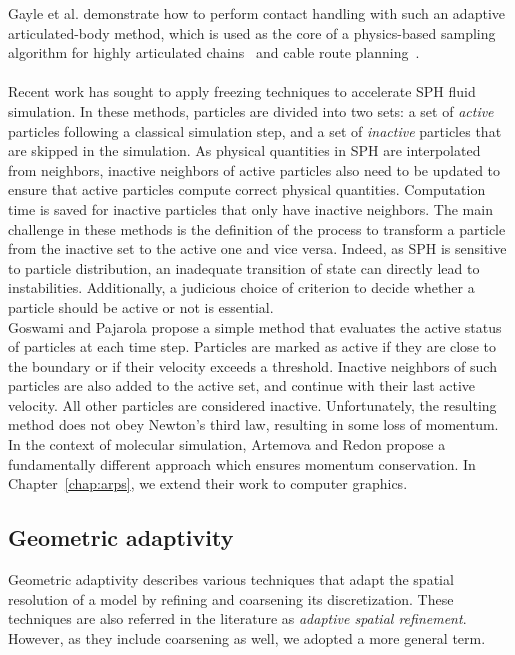 Gayle et al. \cite{Gayle2006} demonstrate how to perform contact handling with such an adaptive articulated-body method, which is used as the core of a physics-based sampling algorithm for highly articulated chains~\cite{Gayle2007} and cable route planning~\cite{Kabul2007}.
\\ \\
Recent work has sought to apply freezing techniques to accelerate SPH fluid simulation.
In these methods, particles are divided into two sets: a set of \emph{active} particles following a classical simulation step, and a set of \emph{inactive} particles that are skipped in the simulation.
As physical quantities in SPH are interpolated from neighbors, inactive neighbors of active particles also need to be updated to ensure that active particles compute correct physical quantities.
Computation time is saved for inactive particles that only have inactive neighbors.
The main challenge in these methods is the definition of the process to transform a particle from the inactive set to the active one and vice versa.
Indeed, as SPH is sensitive to particle distribution, an inadequate transition of state can directly lead to instabilities.
Additionally, a judicious choice of criterion to decide whether a particle should be active or not is essential.
\\
Goswami and Pajarola \cite{Goswami2011} propose a simple method that evaluates the active status of particles at each time step.
Particles are marked as active if they are close to the boundary or if their velocity exceeds a threshold.
Inactive neighbors of such particles are also added to the active set, and continue with their last active velocity.
All other particles are considered inactive.
Unfortunately, the resulting method does not obey Newton's third law, resulting in some loss of momentum.
In the context of molecular simulation, Artemova and Redon \cite{Artemova2012} propose a fundamentally different approach which ensures momentum conservation. In Chapter~\ref{chap:arps}, we extend their work to computer graphics.

\subsection{Geometric adaptivity} 
\label{sec:spatial_refinement}

Geometric adaptivity describes various techniques that adapt the spatial resolution of a model by refining and coarsening its discretization. These techniques are also referred in the literature as \emph{adaptive spatial refinement}. However, as they include coarsening as well, we adopted a more general term.

